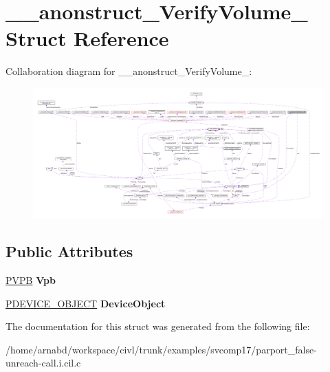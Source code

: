 \hypertarget{struct____anonstruct__VerifyVolume__68}{}\section{\+\_\+\+\_\+anonstruct\+\_\+\+Verify\+Volume\+\_ Struct Reference}
\label{struct____anonstruct__VerifyVolume__68}


Collaboration diagram for \+\_\+\+\_\+anonstruct\+\_\+\+Verify\+Volume\+\_\+:
\nopagebreak
\begin{figure}[H]
\begin{center}
\leavevmode
\includegraphics[width=350pt]{struct____anonstruct__VerifyVolume__68__coll__graph}
\end{center}
\end{figure}
\subsection*{Public Attributes}
\begin{DoxyCompactItemize}
\item 
\hypertarget{struct____anonstruct__VerifyVolume__68_a9530d59e40f8ebc786ebdd9f5834db12}{}\hyperlink{struct__VPB}{P\+V\+P\+B} {\bfseries Vpb}\label{struct____anonstruct__VerifyVolume__68_a9530d59e40f8ebc786ebdd9f5834db12}

\item 
\hypertarget{struct____anonstruct__VerifyVolume__68_a760c55a3559be3fa3f3805edf02ecbdd}{}\hyperlink{struct__DEVICE__OBJECT}{P\+D\+E\+V\+I\+C\+E\+\_\+\+O\+B\+J\+E\+C\+T} {\bfseries Device\+Object}\label{struct____anonstruct__VerifyVolume__68_a760c55a3559be3fa3f3805edf02ecbdd}

\end{DoxyCompactItemize}


The documentation for this struct was generated from the following file\+:\begin{DoxyCompactItemize}
\item 
/home/arnabd/workspace/civl/trunk/examples/svcomp17/parport\+\_\+false-\/unreach-\/call.\+i.\+cil.\+c\end{DoxyCompactItemize}
